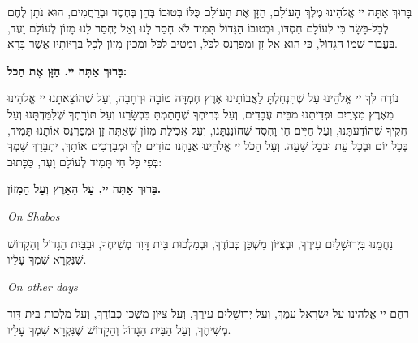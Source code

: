 
בָּרוּךְ אַתָּה יי אֱלֹהֵינוּ מֶלֶךְ הָעוֹלָם, הַזָּן אֶת הָעוֹלָם כֻּלּוֹ בְּטוּבוֹ בְּחֵן בְּחֶסֶד וּבְרַחֲמִים, הוּא נֹתֵן לֶחֶם לְכָל-בָּשָׂר כִּי לְעוֹלָם חַסְדּוֹ, וּבְטוּבוֹ הַגָּדוֹל תָּמִיד לֹא חָסַר לָנוּ וְאַל יֶחְסַר לָנוּ מָזוֹן לְעוֹלָם וָעֶד, בַּעֲבוּר שְׁמוֹ הַגָּדוֹל, כִּי הוּא אֵל זָן וּמְפַרְנֵס לַכֹּל, וּמֵטִיב לַכֹּל וּמֵכִין מָזוֹן לְכָל-בִּרְיּוֹתָיו אֲשֶׁר בָּרָא. 

\begin{center}
{\large \bfseries
בָּרוּךְ אַתָּה יי. הַזָּן אֶת הַכּל:
}
\end{center}


\vspace{1em}

נוֹדֶה לְּךָ יי אֱלֹהֵינוּ עַל שֶׁהִנְחַלְתָּ לַאֲבוֹתֵינוּ אֶרֶץ חֶמְדָּה טוֹבָה וּרְחָבָה, וְעַל שֶׁהוֹצֵאתָנוּ יי אֱלֹהֵינוּ מֵאֶרֶץ מִצְרַיִם וּפְדִיתָנוּ מִבֵּית עֲבָדִים, וְעַל בְּרִיתְךָ שֶׁחָתַמְתָּ בִּבְשָׂרֵנוּ וְעַל תּוֹרָתְךָ שֶׁלִּמַּדְתָּנוּ וְעַל חֻקֶּיךָ שֶׁהוֹדַעְתָּנוּ, וְעַל חַיִּים חֵן וָחֶסֶד שֶׁחוֹנַנְתָּנוּ, וְעַל אֲכִילַת מָזוֹן שָׁאַתָּה זָן וּמְפַרְנֵס אוֹתָנוּ תָּמִיד, בְּכָל יוֹם וּבְכָל עֵת וּבְכָל שָׁעָה. וְעַל הַכֹּל יי אֱלֹהֵינוּ אֲנַחְנוּ מוֹדִים לָךְ וּמְבָרְכִים אוֹתָךְ, יִתְבָּרַךְ שִׁמְךָ בְּפִי כָּל חַי תָּמִיד לְעוֹלָם וָעֶד, כַּכָּתוּב: 

\begin{center}
{\large \bfseries
בָּרוּךְ אַתָּה יי, עַל הָאָרֶץ וְעַל הַמָזוֹן.
}
\end{center}

\vspace{1em}

\begin{minipage}{0.44\linewidth}
\begin{english}\hfill{\itshape On Shabos}\end{english}

נַחֲמֵנוּ בִּיְרוּשָׁלַיִם עִירֶךָ, וּבְצִיּוֹן מִשְׁכַּן כְּבוֹדֶךָ, וּבְמַלְכוּת בֵּית דָּוִד מְשִׁיחֶךָ, וּבַבַּיִת הַגָדוֹל וְהַקָדוֹשׁ שֶׁנִּקְרָא שִׁמְךָ עָלָיו.
\end{minipage}\hspace{0.01\linewidth}\vrule{}\hspace{0.01\linewidth}
\begin{minipage}{0.52\linewidth}
\begin{english}\hfill{\itshape On other days}\end{english}

רַחֶם יי אֱלֹהֵינוּ עַל יִשְׂרָאֵל עַמֶּךָ, וְעַל יְרוּשָׁלַיִם עִירֶךָ, וְעַל צִיּוֹן מִשְׁכַּן כְּבוֹדֶךָ, וְעַל מַלְכוּת בֵּית דָּוִד מְשִׁיחֶךָ, וְעַל הַבַּיִת הַגָדוֹל וְהַקָדוֹשׁ שֶׁנִּקְרָא שִׁמְךָ עָלָיו.
\end{minipage}

